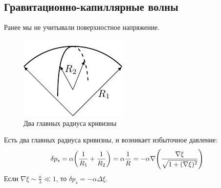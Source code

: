 

\newpage
\subsection{Гравитационно-капиллярные волны}
Ранее мы не учитывали поверхностное напряжение. 

\begin{figure}[H]
    \centering
    \includegraphics[scale=1.5]{img/2rad}
    \caption{Два главных радиуса кривизны}
    \label{fig:2rad}
\end{figure}

Есть два главных радиуса кривизны, и возникает избыточное давление:
\begin{equation}
    \delta p_s = \alpha\qty(\frac{1}{R_1}+\frac{1}{R_2}) = \alpha \frac{1}{R} = -\alpha\nabla \qty(\frac{\nabla\xi}{\sqrt{1+(\nabla\xi)^2}})
\end{equation}
Если $\nabla\xi \sim \frac{a}{\lambda} \ll 1$, то $\delta p_s = -\alpha \Delta \xi$.

